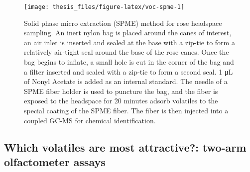 \documentclass{ufdissertation}[overrideChapters] %
\begin{document}
{\begin{figure}
{\centering \texttt{[image: thesis\_files/figure-latex/voc-spme-1]} 

}

\caption[Solid phase micro extraction (SPME) method for rose headspace sampling]{Solid phase micro extraction (SPME) method for rose headspace sampling. An inert nylon bag is placed around the canes of interest, an air inlet is inserted and sealed at the base with a zip-tie to form a relatively air-tight seal around the base of the rose canes. Once the bag begins to inflate, a small hole is cut in the corner of the bag and a filter inserted and sealed with a zip-tie to form a second seal. 1 \si{\micro\liter} of Nonyl Acetate is added as an internal standard. The needle of a SPME fiber holder is used to puncture the bag, and the fiber is exposed to the headspace for 20 minutes adsorb volatiles to the special coating of the SPME fiber. The fiber is then injected into a coupled GC-MS for chemical identification.}\label{fig:voc-spme}
\end{figure}
\hypertarget{which-volatiles-are-most-attractive-two-arm-olfactometer-assays}{%
\subsection{Which volatiles are most attractive?: two-arm olfactometer assays}\label{which-volatiles-are-most-attractive-two-arm-olfactometer-assays}}

}
\end{document}
